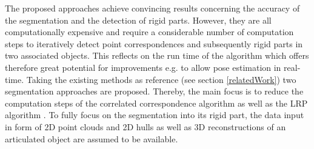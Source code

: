 The proposed approaches achieve convincing results concerning the accuracy of the segmentation and the detection of rigid parts. However, they are all computationally expensive and require a considerable number of computation steps to iteratively detect point correspondences and subsequently rigid parts in two associated objects. This reflects on the run time of the algorithm which offers therefore great potential for improvements e.g. to allow pose estimation in real-time. Taking the existing methods as reference (see section \ref{relatedWork}) two segmentation approaches are proposed. Thereby, the main focus is to reduce the computation steps of the correlated correspondence algorithm \cite{CorrelatedCorrespondance} as well as the LRP algorithm \cite {guo2016correspondence}. To fully focus on the segmentation into its rigid part, the data input in form of 2D point clouds and 2D hulls as well as 3D reconstructions of an articulated object are assumed to be available.